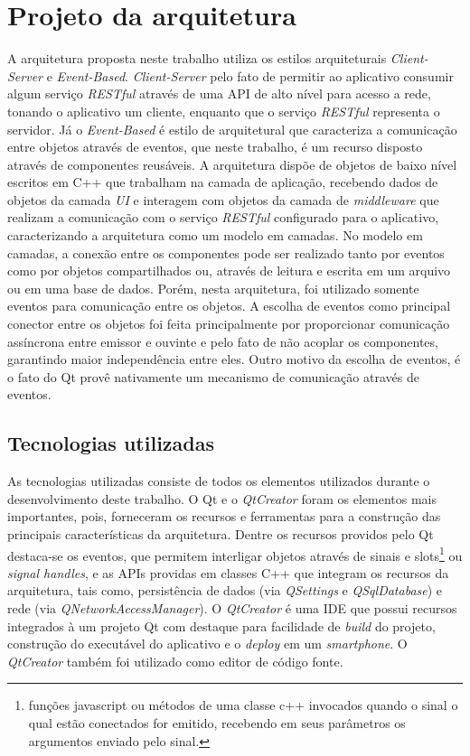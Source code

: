 \section{Projeto da arquitetura}
A arquitetura proposta neste trabalho utiliza os estilos arquiteturais \textit{Client-Server} e \textit{Event-Based}. \textit{Client-Server} pelo fato de permitir ao aplicativo consumir algum serviço \textit{RESTful} através de uma API de alto nível para acesso a rede, tonando o aplicativo um cliente, enquanto que o serviço \textit{RESTful} representa o servidor. Já o \textit{Event-Based} é estilo de arquitetural que caracteriza a comunicação entre objetos através de eventos, que neste trabalho, é um recurso disposto através de componentes reusáveis. A arquitetura dispõe de objetos de baixo nível escritos em C++ que trabalham na camada de aplicação, recebendo dados de objetos da camada \textit{UI} e interagem com objetos da camada de \textit{middleware} que realizam a comunicação com o serviço \textit{RESTful} configurado para o aplicativo, caracterizando a arquitetura como um modelo em camadas. No modelo em camadas, a conexão entre os componentes pode ser realizado tanto por eventos como por objetos compartilhados ou, através de leitura e escrita em um arquivo ou em uma base de dados. Porém, nesta arquitetura, foi utilizado somente eventos para comunicação entre os objetos. A escolha de eventos como principal conector entre os objetos foi feita principalmente por proporcionar comunicação assíncrona entre emissor e ouvinte e pelo fato de não acoplar os componentes, garantindo maior independência entre eles. Outro motivo da escolha de eventos, é o fato do Qt provê nativamente um mecanismo de comunicação através de eventos.\par


\subsection{Tecnologias utilizadas}
As tecnologias utilizadas consiste de todos os elementos utilizados durante o desenvolvimento deste trabalho. O Qt e o \textit{QtCreator} foram os elementos mais importantes, pois, forneceram os recursos e ferramentas para a construção das principais características da arquitetura. Dentre os recursos providos pelo Qt destaca-se os eventos, que permitem interligar objetos através de sinais e slots\footnote{funções javascript ou métodos de uma classe c++ invocados quando o sinal o qual estão conectados for emitido, recebendo em seus parâmetros os argumentos enviado pelo sinal.} ou \textit{signal handles}, e as APIs providas em classes C++ que integram os recursos da arquitetura, tais como, persistência de dados (via \textit{QSettings} e \textit{QSqlDatabase}) e rede (via \textit{QNetworkAccessManager}). O \textit{QtCreator} é uma IDE que possui recursos integrados à um projeto Qt com destaque para facilidade de \textit{build} do projeto, construção do executável do aplicativo e o \textit{deploy} em um \textit{smartphone}. O \textit{QtCreator} também foi utilizado como editor de código fonte.


